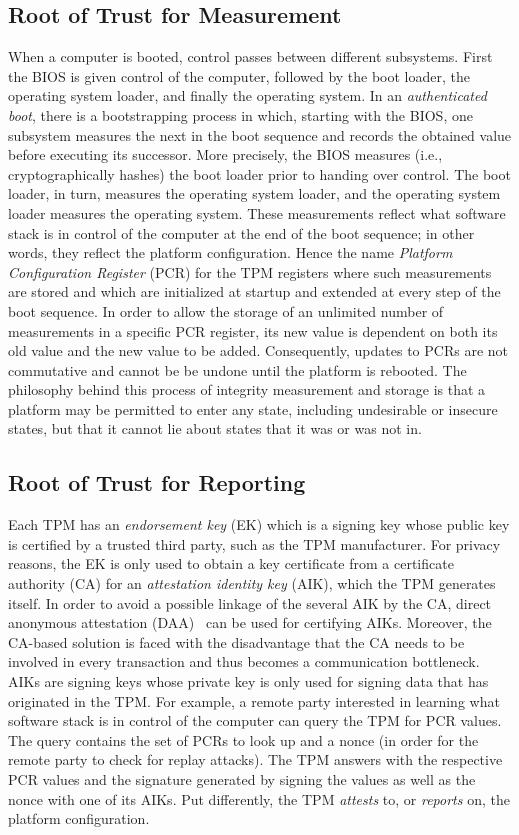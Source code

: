 \documentclass[11pt,letterpaper]{article}
\begin{document}
\subsection{Root of Trust for Measurement}
When a computer is booted, control passes between different subsystems. First the BIOS is given
control of the computer, followed by the boot loader, the operating system loader, and finally the
operating system. In an \emph{authenticated boot}, there is a bootstrapping process in which,
starting with the BIOS, one subsystem measures the next in the boot sequence and records the
obtained value before executing its successor. More precisely, the BIOS measures (i.e.,
cryptographically hashes) the boot loader prior to handing over control. The boot loader, in turn,
measures the operating system loader, and the operating system loader measures the operating system.
These measurements reflect what software stack is in control of the computer at the end of the boot
sequence; in other words, they reflect the platform configuration. Hence the name \emph{Platform
Configuration Register} (PCR) for the TPM registers where such measurements are stored and which
are initialized at startup and extended at every step of the boot sequence. In order to allow the
storage of an unlimited number of measurements in a specific PCR register, its new value is
dependent on both its old value and the new value to be added. Consequently, updates to PCRs are
not commutative and cannot be be undone until the platform is rebooted. The philosophy behind this
process of integrity measurement and storage is that a platform may be permitted to enter any
state, including undesirable or insecure states, but that it cannot lie about states that it was
or was not in.

\subsection{Root of Trust for Reporting}
Each TPM has an \emph{endorsement key} (EK) which is a signing key whose public key is certified by
a trusted third party, such as the TPM manufacturer. For privacy reasons, the EK is only used to
obtain a key certificate from a certificate authority (CA) for an \emph{attestation identity key}
(AIK), which the TPM generates itself. In order to avoid a possible linkage of the several AIK by
the CA, direct anonymous attestation (DAA)~\cite{BrickellEtAl2004,Camenisch2004} can be used
for certifying AIKs. Moreover, the CA-based solution is faced with the disadvantage that the CA
needs to be involved in every transaction and thus becomes a communication bottleneck. AIKs are
signing keys whose private key is only used for signing data that has originated in the TPM. For
example, a remote party interested in learning what software stack is in control of the computer
can query the TPM for PCR values. The query contains the set of PCRs to look up and a nonce (in
order for the remote party to check for replay attacks). The TPM answers with the respective PCR
values and the signature generated by signing the values as well as the nonce with one of its AIKs.
Put differently, the TPM \emph{attests} to, or \emph{reports} on, the platform configuration.
\end{document}
